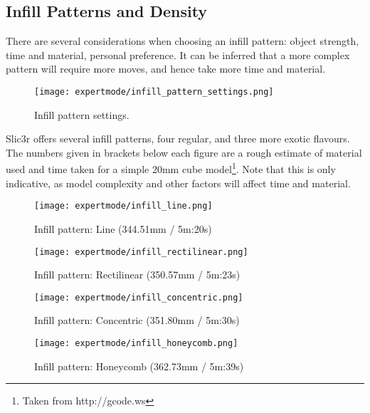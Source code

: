 
\subsection{Infill Patterns and Density} %
\label{sec:infill_patterns_and_density}

There are several considerations when choosing an infill pattern: object strength, time and material, personal preference.  It can be inferred that a more complex pattern will require more moves, and hence take more time and material.

\begin{figure}[H]
\centering
\texttt{[image: expertmode/infill\_pattern\_settings.png]}
\caption{Infill pattern settings.}
\label{fig:infill_pattern_settings}
\end{figure}

Slic3r offers several infill patterns, four regular, and three more exotic flavours.  The numbers given in brackets below each figure are a rough estimate of material used and time taken for a simple 20mm cube model\footnote{Taken from http://gcode.ws}.  Note that this is only indicative, as model complexity and other factors will affect time and material.

\begin{figure}[H]
\centering
\texttt{[image: expertmode/infill\_line.png]}
\caption{Infill pattern: Line (344.51mm / 5m:20s)}
\label{fig:infill_line}
\end{figure}

\begin{figure}[H]
\centering
\texttt{[image: expertmode/infill\_rectilinear.png]}
\caption{Infill pattern: Rectilinear (350.57mm / 5m:23s)}
\label{fig:infill_rectilinear}
\end{figure}

\begin{figure}[H]
\centering
\texttt{[image: expertmode/infill\_concentric.png]}
\caption{Infill pattern: Concentric (351.80mm / 5m:30s)}
\label{fig:infill_concentric}
\end{figure}

\begin{figure}[H]
\centering
\texttt{[image: expertmode/infill\_honeycomb.png]}
\caption{Infill pattern: Honeycomb (362.73mm / 5m:39s)}
\label{fig:infill_honeycomb}
\end{figure}

